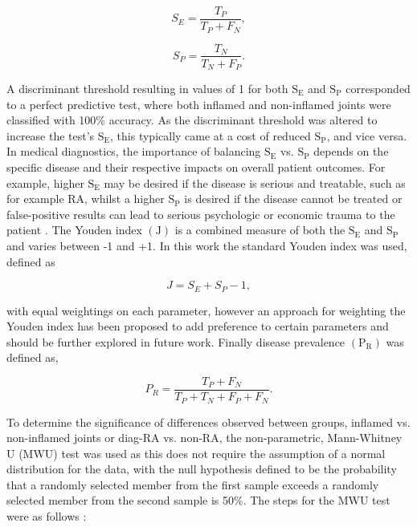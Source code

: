 \documentclass[twoside]{bhamthesis}
\theoremstyle{definition}
\begin{document}
\begin{figure}[!ht]
	\begin{minipage}{.5\textwidth}
   \begin{equation}
S_E = \frac{T_P}{T_P + F_N} ,
  	\label{eqn:sens}
    \end{equation} 
  \end{minipage}%
  \begin{minipage}{.5\textwidth}
    \begin{equation}
S_P = \frac{T_N}{T_N + F_P}.
  	\label{eqn:spe}
    \end{equation}
  \end{minipage}
\end{figure}

A discriminant threshold resulting in values of 1 for both $\mathrm{S_E}$ and $\mathrm{S_P}$ corresponded to a perfect predictive test, where both inflamed and non-inflamed joints were classified with 100\% accuracy. As the discriminant threshold was altered to increase the test's $\mathrm{S_E}$, this typically came at a cost of reduced $\mathrm{S_P}$, and vice versa. In medical diagnostics, the importance of balancing $\mathrm{S_E}$ vs. $\mathrm{S_P}$ depends on the specific disease and their respective impacts on overall patient outcomes. For example, higher $\mathrm{S_E}$ may be desired if the disease is serious and treatable, such as for example RA, whilst a higher $\mathrm{S_P}$ is desired if the disease cannot be treated or false-positive results can lead to serious psychologic or economic trauma to the patient \cite{galan1975beyond}. The Youden index $\mathrm{(J)}$ is a combined measure of both the $\mathrm{S_E}$ and $\mathrm{S_P}$ \cite{youden1950index} and varies between -1 and +1. In this work the standard Youden index was used, defined as

\begin{equation}
J = S_E + S_P - 1,
  \label{eqn:Jouden}
\end{equation}

with equal weightings on each parameter, however an approach for weighting the Youden index has been proposed \cite{galan1975beyond} to add preference to certain parameters and should be further explored in future work. Finally disease prevalence $\mathrm{(P_R)}$ was defined as,

\begin{equation}
P_R = \frac{T_P + F_N}{T_P + T_N + F_P + F_N}.
  \label{eqn:RTE}
\end{equation}

To determine the significance of differences observed between groups, inflamed vs. non-inflamed joints or diag-RA vs. non-RA, the non-parametric, Mann-Whitney U (MWU) test was used as this does not require the assumption of a normal distribution for the data, with the null hypothesis defined to be the probability that a randomly selected member from the first sample exceeds a randomly selected member from the second sample is 50\%. The steps for the MWU test were as follows  \cite{altman1990practical}:
\end{document}
